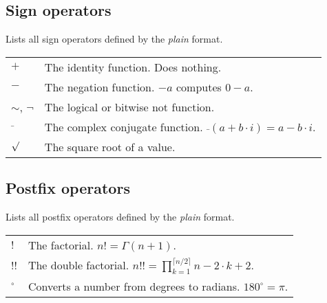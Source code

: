 \documentclass[10pt]{article}
\begin{document}
    \subsection{Sign operators}
    Lists all sign operators defined by the \textit{plain} format.
    \begin{longtable}{p{}p{}}
        $ + $                   & The identity function. Does nothing. \\
        $ - $                   & The negation function. $ -a $ computes $ 0 - a $. \\
        $ \sim $, $ \neg $      & The logical or bitwise not function. \\
        $ \bar{\;} $            & The complex conjugate function. $ \bar{\;}(a + b \cdot i) = a - b \cdot i $. \\
        $ \sqrt{\vphantom{0}} $ & The square root of a value.
    \end{longtable}
    
    \subsection{Postfix operators}
    Lists all postfix operators defined by the \textit{plain} format.
    \begin{longtable}{p{}p{}}
        $ ! $      & The factorial. $ n! = \Gamma(n + 1) $. \\
        $ !! $     & The double factorial. $ n!! = \prod\limits_{k=1}^{\lceil n/2 \rceil} n -2 \cdot k + 2 $. \\
        $ ^\circ $ & Converts a number from degrees to radians. $ 180^\circ = \pi $.
    \end{longtable}
    
\end{document}
